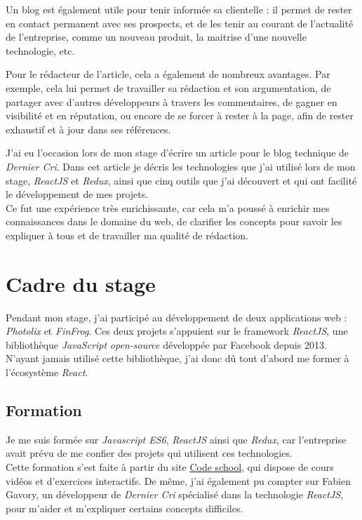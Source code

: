\bigskip

Un blog est également utile pour tenir informée sa clientelle : il
permet de rester en contact permanent avec ses prospects, et de les
tenir au courant de l'actualité de l'entreprise, comme un nouveau
produit, la maitrise d'une nouvelle technologie, etc.

\bigskip

Pour le rédacteur de l'article, cela a également de nombreux avantages.
Par exemple, cela lui permet de travailler sa rédaction et son
argumentation, de partager avec d'autres développeurs à travers les
commentaires, de gagner en visibilité et en réputation, ou encore de se
forcer à rester à la page, afin de rester exhaustif et à jour dans ses
références.

\bigskip

J'ai eu l'occasion lors de mon stage d'écrire un article pour le blog
technique de \emph{Dernier Cri}. Dans cet article je décris les
technologies que j'ai utilisé lors de mon stage, \emph{ReactJS} et
\emph{Redux}, ainsi que cinq outils que j'ai découvert et qui ont
facilité le développement de mes projets.\\
Ce fut une expérience très enrichissante, car cela m'a poussé à enrichir
mes connaissances dans le domaine du web, de clarifier les concepts pour
savoir les expliquer à tous et de travailler ma qualité de rédaction.

\newpage

\section{Cadre du stage}\label{cadre-du-stage}

\bigskip

Pendant mon stage, j'ai participé au développement de deux applications
web : \emph{Photolix} et \emph{FinFrog}. Ces deux projets s'appuient sur
le framework \emph{ReactJS}, une bibliothèque \emph{JavaScript}
\emph{open-source} développée par Facebook depuis 2013. N'ayant jamais
utilisé cette bibliothèque, j'ai donc dû tout d'abord me former à
l'écosystème \emph{React}.

\bigskip

\subsection{Formation}\label{formation}

\bigskip

Je me suis formée sur \emph{Javascript ES6}, \emph{ReactJS} ainsi que
\emph{Redux}, car l'entreprise avait prévu de me confier des projets qui
utilisent ces technologies.\\
Cette formation s'est faite à partir du site
\href{https://www.codeschool.com/}{Code school}, qui dispose de cours
vidéos et d'exercices interactifs. De même, j'ai également pu compter
sur Fabien Gavory, un développeur de \emph{Dernier Cri} spécialisé dans
la technologie \emph{ReactJS}, pour m'aider et m'expliquer certains
concepts difficiles.

